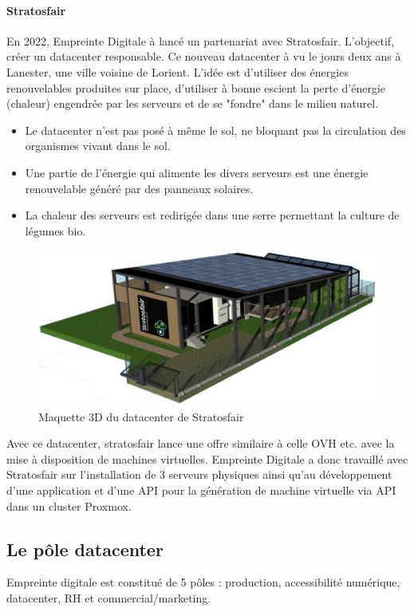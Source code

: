 \documentclass[12pt]{article}
\begin{document}
\paragraph{Stratosfair}
En 2022, Empreinte Digitale à lancé un partenariat avec Stratosfair. 
L'objectif, créer un datacenter responsable. 
Ce nouveau datacenter à vu le jours deux ans à Lanester, une ville voisine de Lorient. 
L'idée est d'utiliser des énergies renouvelables produites sur place, d'utiliser à bonne escient la perte d'énergie (chaleur) engendrée par les serveurs et de se "fondre" dans le milieu naturel.
\begin{itemize}
    \item Le datacenter n'est pas posé à même le sol, ne bloquant pas la circulation des organismes vivant dans le sol.
    \item Une partie de l'énergie qui alimente les divers serveurs est une énergie renouvelable généré par des panneaux solaires.
    \item La chaleur des serveurs est redirigée dans une serre permettant la culture de légumes bio.
\end{itemize}

\begin{figure}[!ht]
    \centering
    \includegraphics[width=\textwidth]{src/strato.jpg}
    \caption{Maquette 3D du datacenter de Stratosfair}
    \label{fig:strato}
\end{figure}

Avec ce datacenter, stratosfair lance une offre similaire à celle OVH etc. avec la mise à disposition de machines virtuelles.
Empreinte Digitale a donc travaillé avec Stratosfair sur l'installation de 3 serveurs physiques ainsi qu'au développement d'une application et d'une API pour la génération de machine virtuelle via API dans un cluster Proxmox.


\subsection{Le pôle datacenter}
Empreinte digitale est constitué de 5 pôles : production, accessibilité numérique, datacenter, RH et commercial/marketing.
\end{document}
